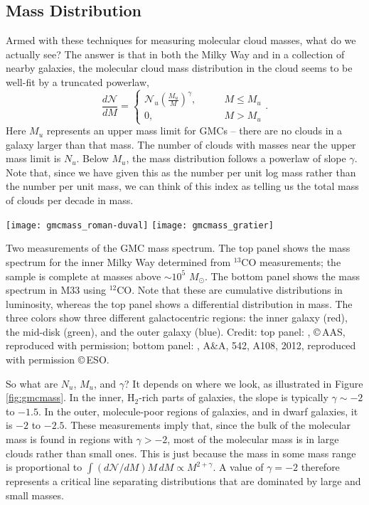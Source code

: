 \subsection{Mass Distribution}

Armed with these techniques for measuring molecular cloud masses, what do we actually see? The answer is that in both the Milky Way and in a collection of nearby galaxies, the molecular cloud mass distribution in the cloud seems to be well-fit by a truncated powerlaw,
\begin{equation}
\frac{d\mathcal{N}}{d M} =
\left\{
\begin{array}{ll}
\mathcal{N}_u \left(\frac{M_u}{M}\right)^{\gamma}, \qquad & M \leq M_u \\
0, & M > M_u
\end{array}
\right..
\end{equation}
Here $M_u$ represents an upper mass limit for GMCs -- there are no clouds in a galaxy larger than that mass. The number of clouds with masses near the upper mass limit is $N_u$. Below $M_u$, the mass distribution follows a powerlaw of slope $\gamma$. Note that, since we have given this as the number per unit log mass rather than the number per unit mass, we can think of this index as telling us the total mass of clouds per decade in mass.

\begin{marginfigure}
\hspace{0.06\linewidth}\texttt{[image: gmcmass\_roman-duval]}
\texttt{[image: gmcmass\_gratier]}
\caption[GMC mass spectra]{
\label{fig:gmcmass}
Two measurements of the GMC mass spectrum. The top panel shows the mass spectrum for the inner Milky Way determined from $^{13}$CO measurements; the sample is complete at masses above $\sim 10^5$ $M_\odot$. The bottom panel shows the mass spectrum in M33 using $^{12}$CO. Note that these are cumulative distributions in luminosity, whereas the top panel shows a differential distribution in mass. The three colors show three different galactocentric regions: the inner galaxy (red), the mid-disk (green), and the outer galaxy (blue).
Credit: top panel: \citet{roman-duval10a}, \copyright\,AAS, reproduced with permission; bottom panel: \citeauthor{gratier12a}, A\&A, 542, A108, 2012, reproduced with permission \copyright\,ESO.
}
\end{marginfigure}

So what are $N_u$, $M_u$, and $\gamma$? It depends on where we look, as illustrated in Figure \ref{fig:gmcmass}. In the inner, H$_2$-rich parts of galaxies, the slope is typically $\gamma \sim -2$ to $-1.5$. In the outer, molecule-poor regions of galaxies, and in dwarf galaxies, it is $-2$ to $-2.5$. These measurements imply that, since the bulk of the molecular mass is found in regions with $\gamma > -2$, most of the molecular mass is in large clouds rather than small ones. This is just because the mass in some mass range is proportional to $\int (d\mathcal{N}/dM) M \, dM \propto M^{2+\gamma}$. A value of $\gamma=-2$ therefore represents a critical line separating distributions that are dominated by large and small masses.

